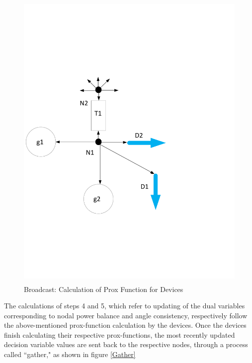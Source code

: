 \documentclass[preprint,12pt,3p]{elsarticle}
\begin{document}
\begin{figure}
\begin{center}
\vspace*{-4cm}
\includegraphics[height=15cm,width=20cm]{Prox_OPF.pdf}
\caption{Broadcast: Calculation of Prox Function for Devices}
\label{Broadcast}
\end{center}
\end{figure}
The calculations of steps 4 and 5, which refer to updating of the dual variables corresponding to nodal power balance and angle consistency, respectively follow the above-mentioned prox-function calculation by the devices. Once the devices finish calculating their respective prox-functions, the most recently updated decision variable values are sent back to the respective nodes, through a process called ``gather," as shown in figure \ref{Gather}
\end{document}
